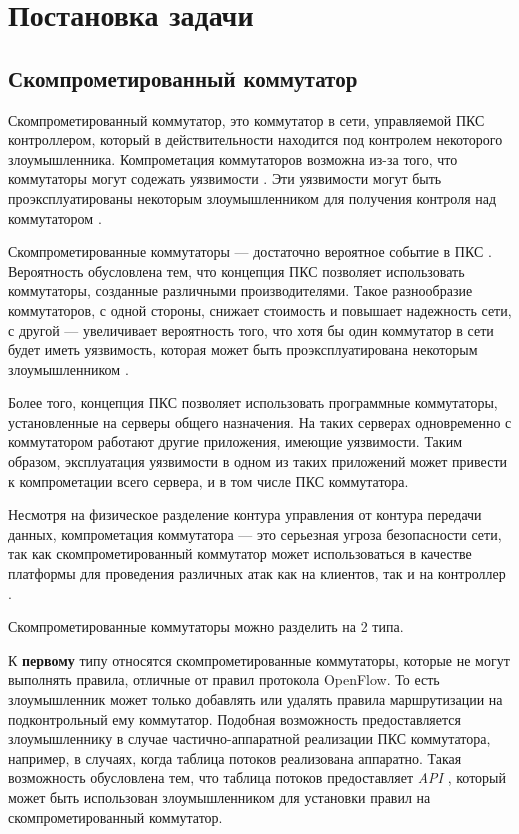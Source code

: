 \documentclass[../thesis.tex]{subfiles}
\begin{document}
\chapter{Постановка задачи} \label{chapter:problem}

\section{Скомпрометированный коммутатор}

Скомпрометированный коммутатор, это коммутатор в сети, управляемой ПКС контроллером, который в действительности находится под контролем некоторого злоумышленника.
Компрометация коммутаторов возможна из-за того, что коммутаторы могут содежать уязвимости \cite{garcia2014analysis, myerson2002identifying, skaggs2002network}.
Эти уязвимости могут быть проэксплуатированы некоторым злоумышленником для получения контроля над коммутатором \cite{thimmaraju2016reins}.

Скомпрометированные коммутаторы --- достаточно вероятное событие в ПКС \cite{scott2013sdn}.
Вероятность обусловлена тем, что концепция ПКС позволяет использовать коммутаторы, созданные различными производителями.
Такое разнообразие коммутаторов, с одной стороны, снижает стоимость и повышает надежность сети, с другой --- увеличивает вероятность того, что хотя бы один коммутатор в сети будет иметь уязвимость, которая может быть проэксплуатирована некоторым злоумышленником \cite{garcia2014analysis}.

Более того, концепция ПКС позволяет использовать программные коммутаторы, установленные на серверы общего назначения.
На таких серверах одновременно с коммутатором работают другие приложения, имеющие уязвимости.
Таким образом, эксплуатация уязвимости в одном из таких приложений может привести к компрометации всего сервера, и в том числе ПКС коммутатора.

Несмотря на физическое разделение контура управления от контура передачи данных, компрометация коммутатора --- это серьезная угроза безопасности сети, так как скомпрометированный коммутатор может использоваться в качестве платформы для проведения различных атак как на клиентов, так и на контроллер \cite{neti2012software}.

Скомпрометированные коммутаторы можно разделить на 2 типа.

К \textbf{первому} типу относятся скомпрометированные коммутаторы, которые не могут выполнять правила, отличные от правил протокола OpenFlow.
То есть злоумышленник может только добавлять или удалять правила маршрутизации на подконтрольный ему коммутатор.
Подобная возможность предоставляется злоумышленнику в случае частично-аппаратной реализации ПКС коммутатора, например, в случаях, когда таблица потоков реализована аппаратно.
Такая возможность обусловлена тем, что таблица потоков предоставляет \textit{API} \cite{naous2008implementing}, который может быть использован злоумышленником для установки правил на скомпрометированный коммутатор.
\end{document}
